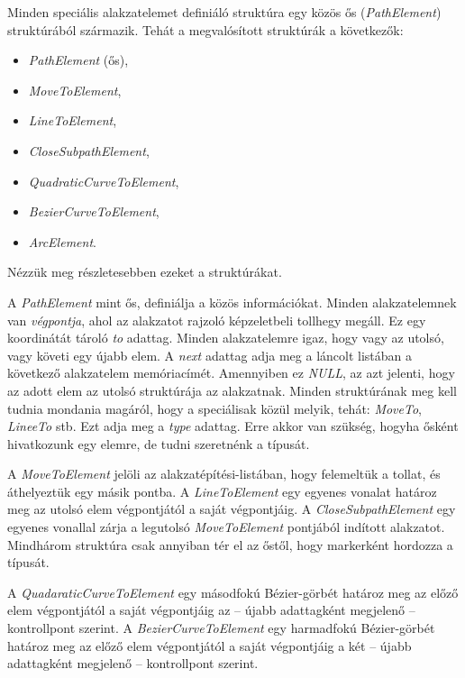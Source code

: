\documentclass[12pt]{report}
\theoremstyle{definition}
\newcommand{\func}[1]{{\textsl{#1}}}
\begin{document}
Minden speciális alakzatelemet definiáló struktúra egy közös ős
(\func{PathElement}) struktúrából származik. Tehát a megvalósított struktúrák a
következők:
  \begin{itemize}
    \item \func{PathElement} (ős),
    \item \func{MoveToElement},
    \item \func{LineToElement},
    \item \func{CloseSubpathElement},
    \item \func{QuadraticCurveToElement},
    \item \func{BezierCurveToElement},
    \item \func{ArcElement}.
  \end{itemize}
Nézzük meg részletesebben ezeket a struktúrákat.

A \func{PathElement} mint ős, definiálja a közös információkat. Minden
alakzatelemnek van \emph{végpontja}, ahol az alakzatot rajzoló képzeletbeli
tollhegy megáll. Ez egy koordinátát tároló \func{to} adattag. Minden
alakzatelemre igaz, hogy vagy az utolsó, vagy követi egy újabb elem. A
\func{next} adattag adja meg a láncolt listában a következő alakzatelem
memóriacímét. Amennyiben ez \func{NULL}, az azt jelenti, hogy az adott elem az
utolsó struktúrája az alakzatnak. Minden struktúrának meg kell tudnia mondania
magáról, hogy a speciálisak közül melyik, tehát: \func{MoveTo}, \func{LineeTo}
stb. Ezt adja meg a \func{type} adattag. Erre akkor van szükség, hogyha ősként
hivatkozunk egy elemre, de tudni szeretnénk a típusát.

A \func{MoveToElement} jelöli az alakzatépítési-listában, hogy felemeltük a
tollat, és áthelyeztük egy másik pontba. A \func{LineToElement} egy egyenes
vonalat határoz meg az utolsó elem végpontjától a saját végpontjáig. A
\func{CloseSubpathElement} egy egyenes vonallal zárja a legutolsó
\func{MoveToElement} pontjából indított alakzatot. Mindhárom struktúra csak
annyiban tér el az őstől, hogy markerként hordozza a típusát.

A \func{QuadaraticCurveToElement} egy másodfokú Bézier-görbét határoz meg az
előző elem végpontjától a saját végpontjáig az -- újabb adattagként megjelenő
-- kontrollpont szerint. A \func{BezierCurveToElement} egy harmadfokú
Bézier-görbét határoz meg az előző elem végpontjától a saját végpontjáig a két
-- újabb adattagként megjelenő -- kontrollpont szerint.
\end{document}
